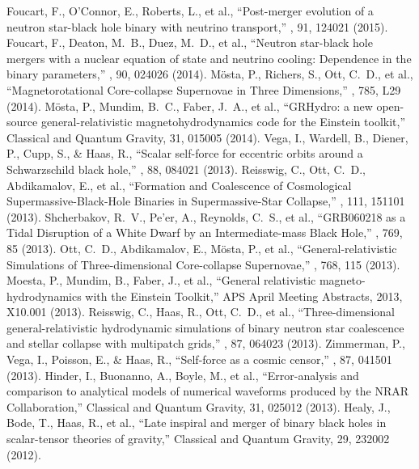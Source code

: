  Foucart, F., O'Connor, E., Roberts, L., et al., ``Post-merger evolution of a neutron star-black hole binary with neutrino transport,'' \prd, 91, 124021 (2015).
 Foucart, F., Deaton, M.~B., Duez, M.~D., et al., ``Neutron star-black hole mergers with a nuclear equation of state and neutrino cooling: Dependence in the binary parameters,'' \prd, 90, 024026 (2014).
 M{\"o}sta, P., Richers, S., Ott, C.~D., et al., ``Magnetorotational Core-collapse Supernovae in Three Dimensions,'' \apjl, 785, L29 (2014).
 M{\"o}sta, P., Mundim, B.~C., Faber, J.~A., et al., ``GRHydro: a new open-source general-relativistic magnetohydrodynamics code for the Einstein toolkit,'' Classical and Quantum Gravity, 31, 015005 (2014).
 Vega, I., Wardell, B., Diener, P., Cupp, S., \& Haas, R., ``Scalar self-force for eccentric orbits around a Schwarzschild black hole,'' \prd, 88, 084021 (2013).
 Reisswig, C., Ott, C.~D., Abdikamalov, E., et al., ``Formation and Coalescence of Cosmological Supermassive-Black-Hole Binaries in Supermassive-Star Collapse,'' \prl, 111, 151101 (2013).
 Shcherbakov, R.~V., Pe'er, A., Reynolds, C.~S., et al., ``GRB060218 as a Tidal Disruption of a White Dwarf by an Intermediate-mass Black Hole,'' \apj, 769, 85 (2013).
 Ott, C.~D., Abdikamalov, E., M{\"o}sta, P., et al., ``General-relativistic Simulations of Three-dimensional Core-collapse Supernovae,'' \apj, 768, 115 (2013).
 Moesta, P., Mundim, B., Faber, J., et al., ``General relativistic magneto-hydrodynamics with the Einstein Toolkit,'' APS April Meeting Abstracts, 2013, X10.001 (2013).
 Reisswig, C., Haas, R., Ott, C.~D., et al., ``Three-dimensional general-relativistic hydrodynamic simulations of binary neutron star coalescence and stellar collapse with multipatch grids,'' \prd, 87, 064023 (2013).
 Zimmerman, P., Vega, I., Poisson, E., \& Haas, R., ``Self-force as a cosmic censor,'' \prd, 87, 041501 (2013).
 Hinder, I., Buonanno, A., Boyle, M., et al., ``Error-analysis and comparison to analytical models of numerical waveforms produced by the NRAR Collaboration,'' Classical and Quantum Gravity, 31, 025012 (2013).
 Healy, J., Bode, T., Haas, R., et al., ``Late inspiral and merger of binary black holes in scalar-tensor theories of gravity,'' Classical and Quantum Gravity, 29, 232002 (2012).
